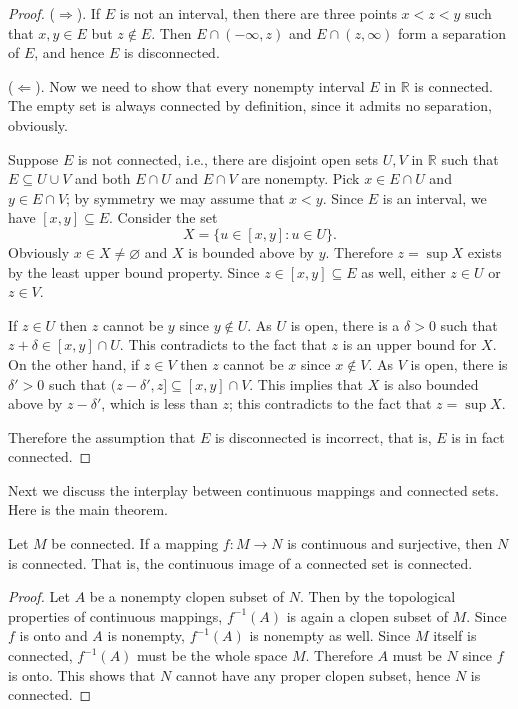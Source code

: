 \begin{proof}
  ($\Longrightarrow$).
  If $E$ is not an interval, then there are three points $x < z < y$ such that $x,y \in E$ but $z \notin E$.
  Then $E \cap (-\infty, z)$ and $E \cap (z, \infty)$ form a separation of $E$, and hence $E$ is disconnected.

 \medskip
 \noindent ($\Longleftarrow$).
 Now we need to show that every nonempty interval $E$ in $\mathbb{R}$ is connected.  The empty set is always connected by definition, since it admits no separation, obviously.

 Suppose $E$ is not connected, i.e., there are disjoint open sets $U, V$ in $\mathbb{R}$ such that $E \subseteq U \cup V$ and both $E \cap U$ and $E \cap V$ are nonempty.
 Pick $x \in E \cap U$ and $y \in E \cap V$; by symmetry we may assume that $x < y$.
 Since $E$ is an interval, we have $[x,y] \subseteq E$.
 Consider the set
 \[
   X = \{ u \in [x,y] \colon u \in U \}.
 \]
 Obviously $x \in X \ne \varnothing$ and $X$ is bounded above by $y$.
 Therefore $z = \sup X$ exists by the least upper bound property.
 Since $z \in [x,y] \subseteq E$ as well, either $z \in U$ or $z \in V$.

 If $z \in U$ then $z$ cannot be $y$ since $y \notin U$.
 As $U$ is open, there is a $\delta > 0$ such that $z + \delta \in [x,y] \cap U$.  This contradicts to the fact that $z$ is an upper bound for $X$.
 On the other hand, if $z \in V$ then $z$ cannot be $x$ since $x \notin V$.
 As $V$ is open, there is $\delta' > 0$ such that $(z-\delta', z] \subseteq [x,y] \cap V$.  This implies that $X$ is also bounded above by $z - \delta'$, which is less than $z$; this contradicts to the fact that $z = \sup X$.

 Therefore the assumption that $E$ is disconnected is incorrect, that is, $E$ is in fact connected.
\end{proof}

Next we discuss the interplay between continuous mappings and connected sets.
Here is the main theorem.

\begin{thm}
  \label{thm:cont-conn}
  Let $M$ be connected.  If a mapping $f: M \to N$ is continuous and surjective, then $N$ is connected.  That is, the continuous image of a connected set is connected.
\end{thm}

\begin{proof}
  Let $A$ be a nonempty clopen subset of $N$.
  Then by the topological properties of continuous mappings, $f^{-1}(A)$ is again a clopen subset of $M$.  Since $f$ is onto and $A$ is nonempty, $f^{-1}(A)$ is nonempty as well.
  Since $M$ itself is connected, $f^{-1}(A)$ must be the whole space $M$.
  Therefore $A$ must be $N$ since $f$ is onto.
  This shows that $N$ cannot have any proper clopen subset, hence $N$ is connected.
\end{proof}

